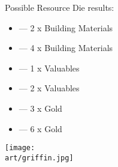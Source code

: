 \begin{multicols}{2}
Possible Resource Die  results:
\medskip
\begin{itemize}
  \setlength\itemsep{8pt}
  \item[{}] — 2 x Building Materials
  \item[{}] — 4 x Building Materials
  \item[{}] — 1 x Valuables
  \item[{}] — 2 x Valuables
  \item[{}] — 3 x Gold
  \item[{}] — 6 x Gold
\end{itemize}


\end{multicols}

\vspace*{\fill}

\begin{scaledfigure}[blanker]
  \centering
  \texttt{[image: \\art/griffin.jpg]}
\end{scaledfigure}
